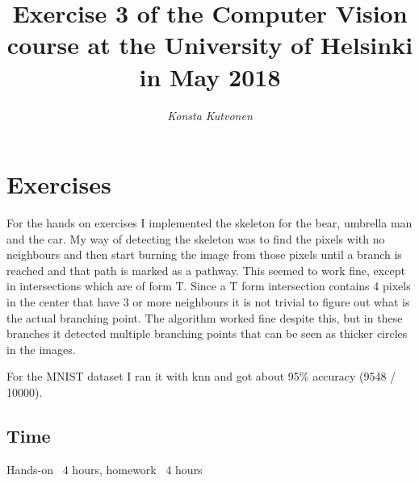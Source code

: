 \documentclass{article}
\begin{document}
\title{Exercise 3 of the Computer Vision course at the
  University of Helsinki in May 2018}

\author{\emph{Konsta Kutvonen}}
\maketitle



\newpage
\section{Exercises}
For the hands on exercises I implemented the skeleton for the bear, umbrella man and the car. My way of detecting the skeleton was to find the pixels with no neighbours and then start burning the image from those pixels until a branch is reached and that path is marked as a pathway. This seemed to work fine, except in intersections which are of form T. Since a T form intersection contains 4 pixels in the center that have 3 or more neighbours it is not trivial to figure out what is the actual branching point. The algorithm worked fine despite this, but in these branches it detected multiple branching points that can be seen as thicker circles in the images.

For the MNIST dataset I ran it with knn and got about 95\% accuracy (9548 / 10000).
\subsection{Time}
Hands-on ~4 hours, homework ~4 hours
\end{document}
